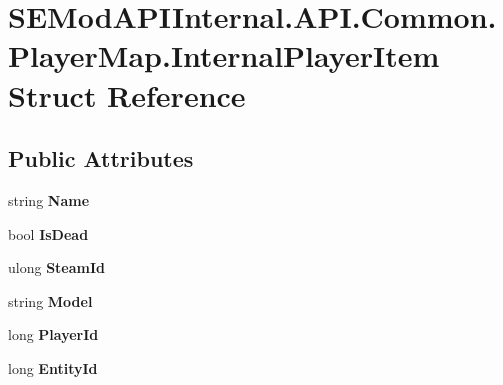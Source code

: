 \hypertarget{struct_s_e_mod_a_p_i_internal_1_1_a_p_i_1_1_common_1_1_player_map_1_1_internal_player_item}{}\section{S\+E\+Mod\+A\+P\+I\+Internal.\+A\+P\+I.\+Common.\+Player\+Map.\+Internal\+Player\+Item Struct Reference}
\label{struct_s_e_mod_a_p_i_internal_1_1_a_p_i_1_1_common_1_1_player_map_1_1_internal_player_item}
\subsection*{Public Attributes}
\begin{DoxyCompactItemize}
\item 
\hypertarget{struct_s_e_mod_a_p_i_internal_1_1_a_p_i_1_1_common_1_1_player_map_1_1_internal_player_item_a7a73c9d287973a7b30f807dc6e1e26ea}{}string {\bfseries Name}\label{struct_s_e_mod_a_p_i_internal_1_1_a_p_i_1_1_common_1_1_player_map_1_1_internal_player_item_a7a73c9d287973a7b30f807dc6e1e26ea}

\item 
\hypertarget{struct_s_e_mod_a_p_i_internal_1_1_a_p_i_1_1_common_1_1_player_map_1_1_internal_player_item_a7a649cf2e639de2c52b852de1ba5adbb}{}bool {\bfseries Is\+Dead}\label{struct_s_e_mod_a_p_i_internal_1_1_a_p_i_1_1_common_1_1_player_map_1_1_internal_player_item_a7a649cf2e639de2c52b852de1ba5adbb}

\item 
\hypertarget{struct_s_e_mod_a_p_i_internal_1_1_a_p_i_1_1_common_1_1_player_map_1_1_internal_player_item_a6c1dc71986c155f062346944543b7589}{}ulong {\bfseries Steam\+Id}\label{struct_s_e_mod_a_p_i_internal_1_1_a_p_i_1_1_common_1_1_player_map_1_1_internal_player_item_a6c1dc71986c155f062346944543b7589}

\item 
\hypertarget{struct_s_e_mod_a_p_i_internal_1_1_a_p_i_1_1_common_1_1_player_map_1_1_internal_player_item_a600761b44842818a47c3d18fd211e1f2}{}string {\bfseries Model}\label{struct_s_e_mod_a_p_i_internal_1_1_a_p_i_1_1_common_1_1_player_map_1_1_internal_player_item_a600761b44842818a47c3d18fd211e1f2}

\item 
\hypertarget{struct_s_e_mod_a_p_i_internal_1_1_a_p_i_1_1_common_1_1_player_map_1_1_internal_player_item_a054e1c3cf71b5d14a5518e189a2de646}{}long {\bfseries Player\+Id}\label{struct_s_e_mod_a_p_i_internal_1_1_a_p_i_1_1_common_1_1_player_map_1_1_internal_player_item_a054e1c3cf71b5d14a5518e189a2de646}

\item 
\hypertarget{struct_s_e_mod_a_p_i_internal_1_1_a_p_i_1_1_common_1_1_player_map_1_1_internal_player_item_ad002564d1d1250ddeeeed46f9ff36e79}{}long {\bfseries Entity\+Id}\label{struct_s_e_mod_a_p_i_internal_1_1_a_p_i_1_1_common_1_1_player_map_1_1_internal_player_item_ad002564d1d1250ddeeeed46f9ff36e79}

\end{DoxyCompactItemize}


